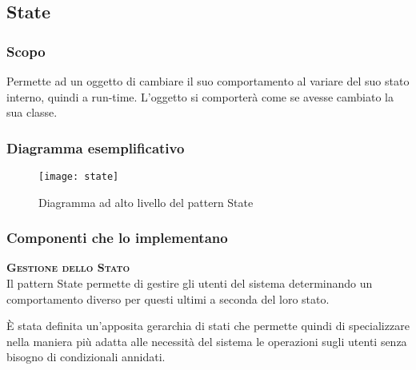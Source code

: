 \subsection{State}

\subsubsection{Scopo}
Permette ad un oggetto di cambiare il suo comportamento al variare del suo stato interno, quindi a run-time. L'oggetto si comporterà come se avesse cambiato la sua classe.

\subsubsection{Diagramma esemplificativo}
\begin{figure}[H]
\centering
\texttt{[image: state]}
\caption{Diagramma ad alto livello del pattern State}\label{fig:state}
\end{figure}

\subsubsection{Componenti che lo implementano}
\begin{description}
\item{\scshape\bfseries Gestione dello Stato}\\
Il pattern State permette di gestire gli utenti del sistema determinando un comportamento diverso per questi ultimi a seconda del loro stato.

È stata definita un'apposita gerarchia di stati che permette quindi di specializzare nella maniera più adatta alle necessità del sistema le operazioni sugli utenti senza bisogno di condizionali annidati.
\end{description}
\clearpage

